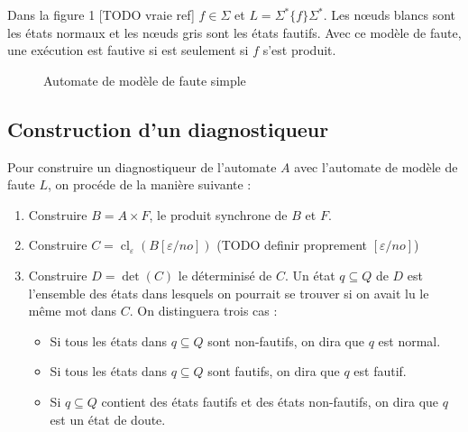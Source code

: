 \documentclass[10pt,a4paper]{article}
\begin{document}
   Dans la figure 1 [TODO vraie ref] $f\in \Sigma$ et $L  = \Sigma^*\{f\}\Sigma^*$. Les  nœuds blancs sont les états normaux et les nœuds gris sont les \'etats fautifs. Avec ce mod\`ele de faute, une ex\'ecution est fautive si est seulement si $f$ s'est produit.
        \begin{figure}[H]
                \centering
                \caption{Automate de mod\`ele de faute simple}
        \end{figure}
        
    
    \subsection{Construction d'un diagnostiqueur}
    Pour construire un diagnostiqueur de l'automate $A$ avec l'automate de mod\`ele de faute $L$, on proc\'ede de la mani\`ere suivante :
    
\begin{enumerate}
  \item Construire $B=A\times F$, le produit synchrone de $B$ et $F$.
  \item Construire $C=\operatorname{cl}_\varepsilon(B[\varepsilon/no])$ (TODO definir proprement $[\varepsilon/no]$)
  \item Construire $D=\det(C)$ le d\'eterminis\'e de $C$. Un \'etat $q\subseteq Q$ de $D$ est l'ensemble des \'etats dans lesquels on pourrait se trouver si on avait lu le m\^eme mot dans $C$. On distinguera trois cas :
  \begin{itemize}
    \item Si tous les \'etats dans $q\subseteq Q$ sont non-fautifs, on dira que $q$ est normal.
    \item Si tous les \'etats dans $q\subseteq Q$ sont fautifs, on dira que $q$ est fautif.
    \item Si $q\subseteq Q$ contient des \'etats fautifs et des \'etats non-fautifs, on dira que $q$ est un \'etat de doute.
  \end{itemize}
\end{enumerate} 
     
\end{document}
